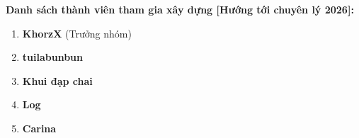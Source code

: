 { \normalcolor \textbf{Danh sách thành viên tham gia xây dựng [Hướng tới chuyên lý 2026]:}} \\ \vspace{0.5cm}

\begin{enumerate}
    \item \textbf{KhorzX} (Trưởng nhóm)
    \item \textbf{tuilabunbun}
    \item \textbf{Khui đạp chai}
    \item \textbf{Log}
   \item \textbf{Carina}
\end{enumerate}

